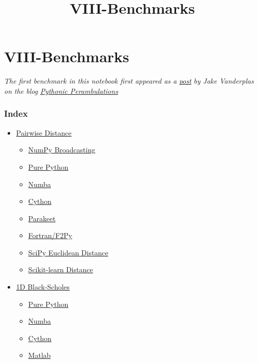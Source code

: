 \documentclass{article}
\title{VIII-Benchmarks}
\begin{document}
    
    
    \maketitle
    
    

    
    

    \section{VIII-Benchmarks}\label{viii-benchmarks}

    \emph{The first benchmark in this notebook first appeared as a}
\href{http://jakevdp.github.io/blog/2012/08/24/numba-vs-cython/}{\emph{post}}
\emph{by Jake Vanderplas on the blog}
\href{http://jakevdp.github.io}{\emph{Pythonic Perambulations}}

    \subsubsection{Index}\label{index}

\begin{itemize}
\itemsep1pt\parskip0pt
\item
  \hyperref[Pairwise-Distance]{Pairwise Distance}

  \begin{itemize}
  \itemsep1pt\parskip0pt
  \item
    \hyperref[Numpy-broadcasting]{NumPy Broadcasting}
  \item
    \hyperref[Pure-python]{Pure Python}
  \item
    \hyperref[Numba]{Numba}
  \item
    \hyperref[Cython]{Cython}
  \item
    \hyperref[Parakeet]{Parakeet}
  \item
    \hyperref[Fortran-f2py]{Fortran/F2Py}
  \item
    \hyperref[Scipy-pairwise-distances]{SciPy Euclidean Distance}
  \item
    \hyperref[Scikitlearn-pairwise-distances]{Scikit-learn Distance}
  \end{itemize}
\item
  \hyperref[1Dux5cux2520Black-Scholes]{1D Black-Scholes}

  \begin{itemize}
  \itemsep1pt\parskip0pt
  \item
    \hyperref[1DBS-PurePython]{Pure Python}
  \item
    \hyperref[1DBS-Numba]{Numba}
  \item
    \hyperref[1DBS-Cython]{Cython}
  \item
    \hyperref[1DBS-MATLAB]{Matlab}
  \end{itemize}
\end{itemize}
\end{document}
